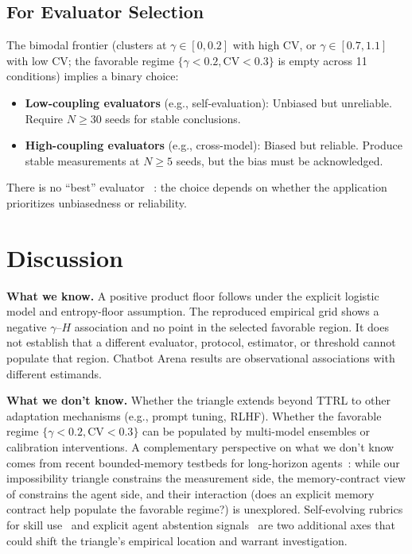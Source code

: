 \documentclass[11pt]{article}
\begin{document}
\subsection{For Evaluator Selection}

The bimodal frontier (clusters at $\gamma \in [0, 0.2]$ with high $\mathrm{CV}$, or $\gamma \in [0.7, 1.1]$ with low $\mathrm{CV}$; the favorable regime $\{\gamma < 0.2, \mathrm{CV} < 0.3\}$ is empty across 11 conditions) implies a binary choice:

\begin{itemize}[leftmargin=*,nosep]
 \item \textbf{Low-coupling evaluators} (e.g., self-evaluation): Unbiased but unreliable. Require $N \geq 30$ seeds for stable conclusions.
 \item \textbf{High-coupling evaluators} (e.g., cross-model): Biased but reliable. Produce stable measurements at $N \geq 5$ seeds, but the bias must be acknowledged.
\end{itemize}

There is no ``best'' evaluator~\cite{wolpert1997no} : the choice depends on whether the application prioritizes unbiasedness or reliability.

\section{Discussion}

\textbf{What we know.} A positive product floor follows under the explicit logistic model and entropy-floor assumption. The reproduced empirical grid shows a negative $\gamma$--$H$ association and no point in the selected favorable region. It does not establish that a different evaluator, protocol, estimator, or threshold cannot populate that region. Chatbot Arena results are observational associations with different estimands.

\textbf{What we don't know.} Whether the triangle extends beyond TTRL to other adaptation mechanisms (e.g., prompt tuning, RLHF). Whether the favorable regime $\{\gamma < 0.2, \mathrm{CV} < 0.3\}$ can be populated by multi-model ensembles or calibration interventions. A complementary perspective on what we don't know comes from recent bounded-memory testbeds for long-horizon agents~\cite{cheng2026agenticsts}: while our impossibility triangle constrains the measurement side, the memory-contract view of \citet{cheng2026agenticsts} constrains the agent side, and their interaction (does an explicit memory contract help populate the favorable regime?) is unexplored. Self-evolving rubrics for skill use~\cite{zhu2026skillcoach} and explicit agent abstention signals~\cite{luo2026abstention} are two additional axes that could shift the triangle's empirical location and warrant investigation.
\end{document}
